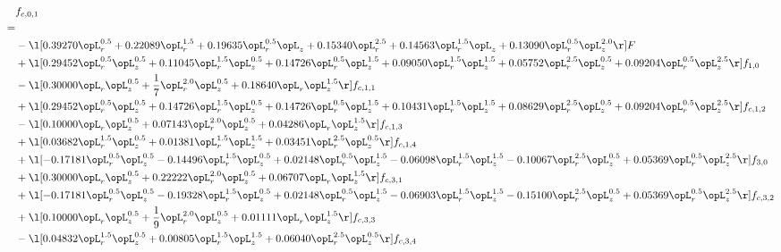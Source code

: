 \begin{alignat}{2} 
\label{eq:f_01_2} 
& f_{c,0,1} \nonumber \\ 
 = \\ 
& - \l[  0.39270 \opL_r^{0.5} +  0.22089 \opL_r^{1.5} +  0.19635 \opL_r^{0.5} \opL_z +  0.15340 \opL_r^{2.5} +  0.14563 \opL_r^{1.5} \opL_z +  0.13090 \opL_r^{0.5} \opL_z^{2.0}  \r] F \nonumber \\ 
& + \l[  0.29452 \opL_r^{0.5} \opL_z^{0.5} +  0.11045 \opL_r^{1.5} \opL_z^{0.5} +  0.14726 \opL_r^{0.5} \opL_z^{1.5} +  0.09050 \opL_r^{1.5} \opL_z^{1.5} +  0.05752 \opL_r^{2.5} \opL_z^{0.5} +  0.09204 \opL_r^{0.5} \opL_z^{2.5}  \r] f_{1,0} \nonumber \\ 
& - \l[  0.30000 \opL_r \opL_z^{0.5} + \frac{1}{7} \opL_r^{2.0} \opL_z^{0.5} +  0.18640 \opL_r \opL_z^{1.5}  \r] f_{c,1,1} \nonumber \\ 
& + \l[  0.29452 \opL_r^{0.5} \opL_z^{0.5} +  0.14726 \opL_r^{1.5} \opL_z^{0.5} +  0.14726 \opL_r^{0.5} \opL_z^{1.5} +  0.10431 \opL_r^{1.5} \opL_z^{1.5} +  0.08629 \opL_r^{2.5} \opL_z^{0.5} +  0.09204 \opL_r^{0.5} \opL_z^{2.5}  \r] f_{c,1,2} \nonumber \\ 
& - \l[  0.10000 \opL_r \opL_z^{0.5} +  0.07143 \opL_r^{2.0} \opL_z^{0.5} +  0.04286 \opL_r \opL_z^{1.5}  \r] f_{c,1,3} \nonumber \\ 
& + \l[  0.03682 \opL_r^{1.5} \opL_z^{0.5} +  0.01381 \opL_r^{1.5} \opL_z^{1.5} +  0.03451 \opL_r^{2.5} \opL_z^{0.5}  \r] f_{c,1,4} \nonumber \\ 
& + \l[  -0.17181 \opL_r^{0.5} \opL_z^{0.5}   -0.14496 \opL_r^{1.5} \opL_z^{0.5} +  0.02148 \opL_r^{0.5} \opL_z^{1.5}   -0.06098 \opL_r^{1.5} \opL_z^{1.5}   -0.10067 \opL_r^{2.5} \opL_z^{0.5} +  0.05369 \opL_r^{0.5} \opL_z^{2.5}  \r] f_{3,0} \nonumber \\ 
& + \l[  0.30000 \opL_r \opL_z^{0.5} +  0.22222 \opL_r^{2.0} \opL_z^{0.5} +  0.06707 \opL_r \opL_z^{1.5}  \r] f_{c,3,1} \nonumber \\ 
& + \l[  -0.17181 \opL_r^{0.5} \opL_z^{0.5}   -0.19328 \opL_r^{1.5} \opL_z^{0.5} +  0.02148 \opL_r^{0.5} \opL_z^{1.5}   -0.06903 \opL_r^{1.5} \opL_z^{1.5}   -0.15100 \opL_r^{2.5} \opL_z^{0.5} +  0.05369 \opL_r^{0.5} \opL_z^{2.5}  \r] f_{c,3,2} \nonumber \\ 
& + \l[  0.10000 \opL_r \opL_z^{0.5} + \frac{1}{9} \opL_r^{2.0} \opL_z^{0.5} +  0.01111 \opL_r \opL_z^{1.5}  \r] f_{c,3,3} \nonumber \\ 
& - \l[  0.04832 \opL_r^{1.5} \opL_z^{0.5} +  0.00805 \opL_r^{1.5} \opL_z^{1.5} +  0.06040 \opL_r^{2.5} \opL_z^{0.5}  \r] f_{c,3,4} \nonumber \\ 

\end{alignat}
